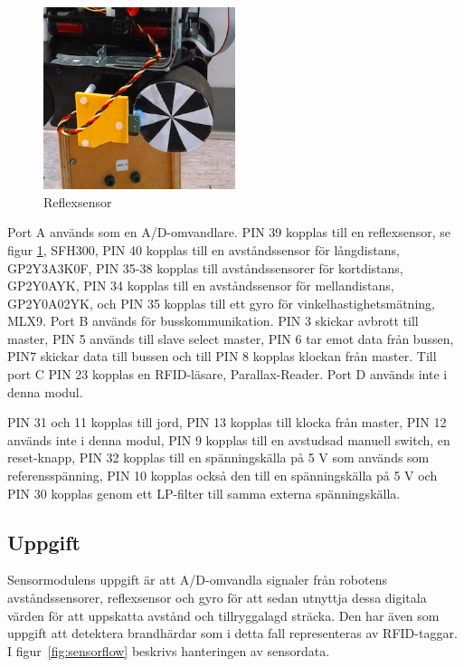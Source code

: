 \documentclass[a4paper,12pt,fleqn]{article}
\begin{document}
\begin{figure}[htp] %
  \begin{center}
  \includegraphics[keepaspectratio=true,width=0.5\textwidth]{../Kappa/reflexsensor.png}  %
  \end{center}
  \caption{Reflexsensor} %
  \label{fig:reflex} %
\end{figure}

Port A används som en A/D-omvandlare. PIN 39 kopplas till en reflexsensor, se figur \ref{fig:reflex}, SFH300, PIN 40 kopplas till en avståndssensor för långdistans, GP\-2Y\-3A\-3K\-0F, PIN 35-38 kopplas till avståndssensorer för kortdistans, GP\-2Y\-0A\-YK, 
PIN 34 kopplas till en avståndssensor för mellandistans, GP2Y0A02YK, och PIN 35 kopplas till ett gyro för vinkelhastighetsmätning, ML\-X9. Port B används för busskommunikation. PIN 3 skickar avbrott till master, PIN 5 används till slave select master, PIN 6 tar emot data från bussen, PIN7 skickar data till bussen och till PIN 8 kopplas klockan från master. Till port C PIN 23 kopplas en RFID-läsare, Parallax-Reader. Port D används inte i denna modul. 

PIN 31 och 11 kopplas till jord, PIN 13 kopplas till klocka från master, PIN 12 används inte i denna modul, PIN 9 kopplas till en avstudsad manuell switch, en reset-knapp, PIN 32 kopplas till en spänningskälla på 5 V som används som referensspänning, PIN 10 kopplas också den till en spänningskälla på 5 V och PIN 30 kopplas genom ett LP-filter till samma externa spänningskälla.


\subsection{Uppgift}
Sensormodulens uppgift är att A/D-omvandla signaler från robotens avståndssensorer, reflexsensor och gyro för att sedan utnyttja dessa digitala värden för att uppskatta avstånd och tillryggalagd sträcka. Den har även som uppgift att detektera brandhärdar som i detta fall representeras av RFID-taggar. I figur~\ref{fig:sensorflow} beskrivs hanteringen av sensordata.
\end{document}
